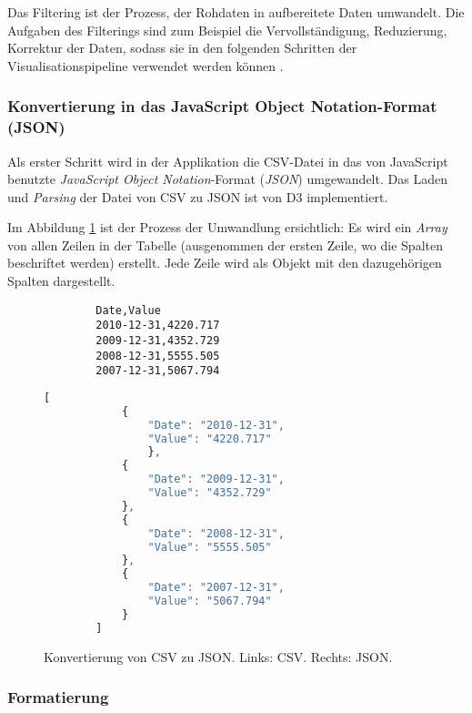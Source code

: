 Das Filtering ist der Prozess, der Rohdaten in aufbereitete Daten umwandelt. Die Aufgaben des Filterings sind zum Beispiel die Vervollständigung, Reduzierung, Korrektur der Daten, sodass sie in den folgenden Schritten der Visualisationspipeline verwendet werden können \cite[Kap. 2]{viz}.

\subsubsection{Konvertierung in das JavaScript Object Notation-Format (JSON)}

Als erster Schritt wird in der Applikation die CSV-Datei in das von JavaScript benutzte \textit{JavaScript Object Notation}-Format (\textit{JSON}) umgewandelt. Das Laden und \textit{Parsing} der Datei von CSV zu JSON ist von D3 implementiert.

Im Abbildung \ref{fig:csv-json} ist der Prozess der Umwandlung ersichtlich: Es wird ein \textit{Array} von allen Zeilen in der Tabelle (ausgenommen der ersten Zeile, wo die Spalten beschriftet werden) erstellt. Jede Zeile wird als Objekt mit den dazugehörigen Spalten dargestellt.

\begin{figure}[!htbp]
	\centering
	\begin{minipage}{0.45\textwidth}
		\centering
		\begin{lstlisting}
		Date,Value
		2010-12-31,4220.717
		2009-12-31,4352.729
		2008-12-31,5555.505
		2007-12-31,5067.794
		\end{lstlisting}
	\end{minipage}\hfill
	\begin{minipage}{0.45\textwidth}
		\centering
		\begin{lstlisting}[language=javascript]
		[
			{
				"Date": "2010-12-31",
				"Value": "4220.717"
				},
			{
				"Date": "2009-12-31",
				"Value": "4352.729"
			},
			{
				"Date": "2008-12-31",
				"Value": "5555.505"
			},
			{
				"Date": "2007-12-31",
				"Value": "5067.794"
			}
		]
		\end{lstlisting}
	\end{minipage}
	\caption[CSV und JSON]{Konvertierung von CSV zu JSON. Links: CSV. Rechts: JSON.}
	\label{fig:csv-json}
\end{figure}

\subsubsection{Formatierung}

